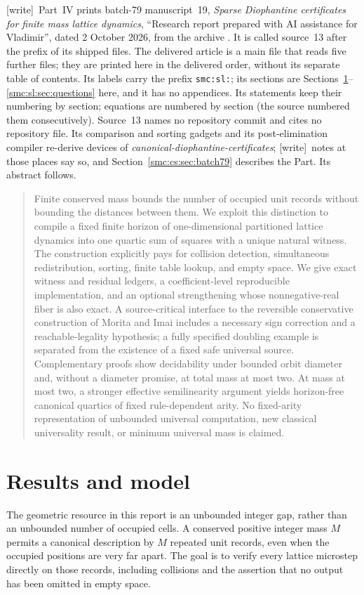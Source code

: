 \documentclass[11pt,letterpaper]{article}
\numberwithin{equation}{section}
\theoremstyle{definition}
\theoremstyle{remark}
\newcommand{\wtag}{\textup{[write]}}
\begin{document}
\noindent\wtag\ Part~IV prints batch-79 manuscript~19, \emph{Sparse Diophantine certificates for finite mass lattice dynamics}, ``Research report prepared with AI assistance for Vladimir'', dated 2 October 2026, from the archive . It is called source~13 after the prefix of its shipped files. The delivered article is a main file that reads five further files; they are printed here in the delivered order, without its separate table of contents. Its labels carry the prefix \texttt{smc:sl:}; its sections are Sections~\ref{smc:sl:sec:model}--\ref{smc:sl:sec:questions} here, and it has no appendices. Its statements keep their numbering by section; equations are numbered by section (the source numbered them consecutively). Source~13 names no repository commit and cites no repository file. Its comparison and sorting gadgets and its post-elimination compiler re-derive devices of \emph{canonical-diophantine-certificates}; \wtag\ notes at those places say so, and Section~\ref{smc:cs:sec:batch79} describes the Part. Its abstract follows.
\begin{quote}\small
Finite conserved mass bounds the number of occupied unit records without bounding the distances between them. We exploit this distinction to compile a fixed finite horizon of one-dimensional partitioned lattice dynamics into one quartic sum of squares with a unique natural witness. The construction explicitly pays for collision detection, simultaneous redistribution, sorting, finite table lookup, and empty space. We give exact witness and residual ledgers, a coefficient-level reproducible implementation, and an optional strengthening whose nonnegative-real fiber is also exact. A source-critical interface to the reversible conservative construction of Morita and Imai includes a necessary sign correction and a reachable-legality hypothesis; a fully specified doubling example is separated from the existence of a fixed safe universal source. Complementary proofs show decidability under bounded orbit diameter and, without a diameter promise, at total mass at most two. At mass at most two, a stronger effective semilinearity argument yields horizon-free canonical quartics of fixed rule-dependent arity. No fixed-arity representation of unbounded universal computation, new classical universality result, or minimum universal mass is claimed.
\end{quote}

\section{Results and model}\label{smc:sl:sec:model}
The geometric resource in this report is an unbounded integer gap, rather than an unbounded number of occupied cells. A conserved positive integer mass $M$ permits a canonical description by $M$ repeated unit records, even when the occupied positions are very far apart. The goal is to verify every lattice microstep directly on those records, including collisions and the assertion that no output has been omitted in empty space.
\end{document}
